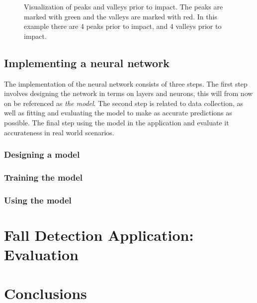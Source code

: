 \documentclass[12pt, a4paper, onecolumn]{article}
\begin{document}
	\begin{figure}[H]
		\centering
		\caption{Visualization of peaks and valleys prior to impact. The peaks are marked with green and the valleys are marked with red. In this example there are 4 peaks prior to impact, and 4 valleys prior to impact.}%
		\label{fig:fall-data-peaks-and-valleys}%
	\end{figure}
	
	\subsection{Implementing a neural network}
	The implementation of the neural network consists of three steps. The first step involves designing the network in terms on layers and neurons, this will from now on be referenced as \textit{the model}. The second step is related to data collection, as well as fitting and evaluating the model to make as accurate predictions as possible. The final step using the model in the application and evaluate it accurateness in real world scenarios.
	
	\subsubsection{Designing a model}
	
	\subsubsection{Training the model}
	
	\subsubsection{Using the model}
	
	
	
	\newpage
	
	\section{Fall Detection Application: Evaluation}
	\newpage
	
	\section{Conclusions}
	\newpage
		
	
	
\end{document}
